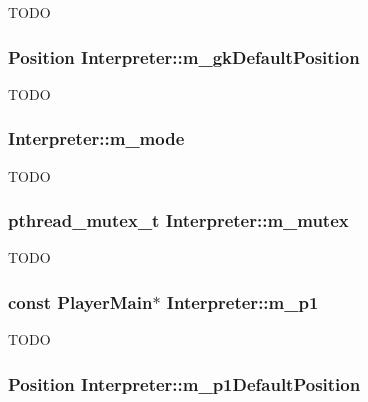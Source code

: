 \label{classInterpreter_a5c100f5098dbea4f12c8e65524914891}
TODO \hypertarget{classInterpreter_a3406559374dd0b28b8d702e5ba03189b}{
\subsubsection[{m\_\-gkDefaultPosition}]{\setlength{\rightskip}{0pt plus 5cm}Position {\bf Interpreter::m\_\-gkDefaultPosition}}}
\label{classInterpreter_a3406559374dd0b28b8d702e5ba03189b}
TODO \hypertarget{classInterpreter_aea59ccd407d1cbe579827da6ef24c9a1}{
\subsubsection[{m\_\-mode}]{ {\bf Interpreter::m\_\-mode}}}
\label{classInterpreter_aea59ccd407d1cbe579827da6ef24c9a1}
TODO \hypertarget{classInterpreter_a4b1e804ce863d4d017e4b697e61e4017}{
\subsubsection[{m\_\-mutex}]{\setlength{\rightskip}{0pt plus 5cm}pthread\_\-mutex\_\-t {\bf Interpreter::m\_\-mutex}}}
\label{classInterpreter_a4b1e804ce863d4d017e4b697e61e4017}
TODO \hypertarget{classInterpreter_af450bd472149d0832c48e5da0a21ac77}{
\subsubsection[{m\_\-p1}]{\setlength{\rightskip}{0pt plus 5cm}const {\bf PlayerMain}$\ast$ {\bf Interpreter::m\_\-p1}}}
\label{classInterpreter_af450bd472149d0832c48e5da0a21ac77}
TODO \hypertarget{classInterpreter_a681f0273945917ab4dabec7b400bf001}{
\subsubsection[{m\_\-p1DefaultPosition}]{\setlength{\rightskip}{0pt plus 5cm}Position {\bf Interpreter::m\_\-p1DefaultPosition}}}
